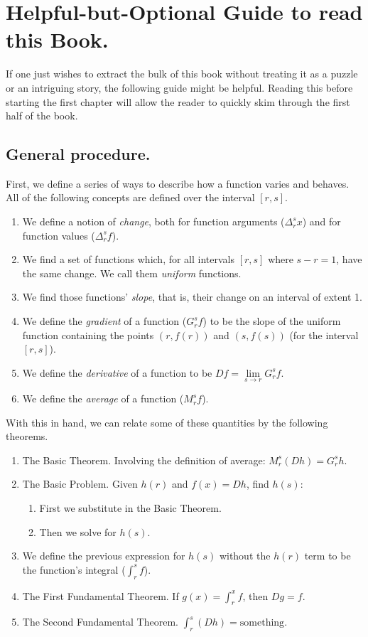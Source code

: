 \section{Helpful-but-Optional Guide to read this Book.}

If one just wishes to extract the bulk of this book without treating it as a puzzle or an intriguing story, the following guide might be helpful. Reading this before starting the first chapter will allow the reader to quickly skim through the first half of the book.

\subsection{General procedure.}

First, we define a series of ways to describe how a function varies and behaves. All of the following concepts are defined over the interval $[r, s]$.

\begin{enumerate}
	\item We define a notion of \textit{change}, both for function arguments ($\Delta_r^s x$) and for function values ($\Delta_r^s f$).
	\item We find a set of functions which, for all intervals $[r, s]$ where $s - r = 1$, have the same change. We call them \textit{uniform} functions.
	\item We find those functions' \textit{slope}, that is, their change on an interval of extent 1.
	\item We define the \textit{gradient} of a function ($G_r^s f$) to be the slope of the uniform function containing the points $(r, f(r))$ and $(s, f(s))$ (for the interval $[r, s]$).
	\item We define the \textit{derivative} of a function to be $Df = \lim\limits_{s \to r} G_r^s f$.
	\item We define the \textit{average} of a function ($M_r^s f$).
\end{enumerate}

With this in hand, we can relate some of these quantities by the following theorems.

\begin{enumerate}
	\item The Basic Theorem. Involving the definition of average: $M_r^s (Dh) = G_r^s h$.
	\item The Basic Problem. Given $h(r)$ and $f(x) = Dh$, find $h(s)$:
		\begin{enumerate}
			\item First we substitute in the Basic Theorem.
			\item Then we solve for $h(s)$.
		\end{enumerate}
	\item We define the previous expression for $h(s)$ without the $h(r)$ term to be the function's integral ($\int_r^s f$).
	\item The First Fundamental Theorem. If $g(x) = \int_r^x f$, then $Dg = f$.
	\item The Second Fundamental Theorem. $\int_r^s (Dh) = \textrm{something}$.
\end{enumerate}

